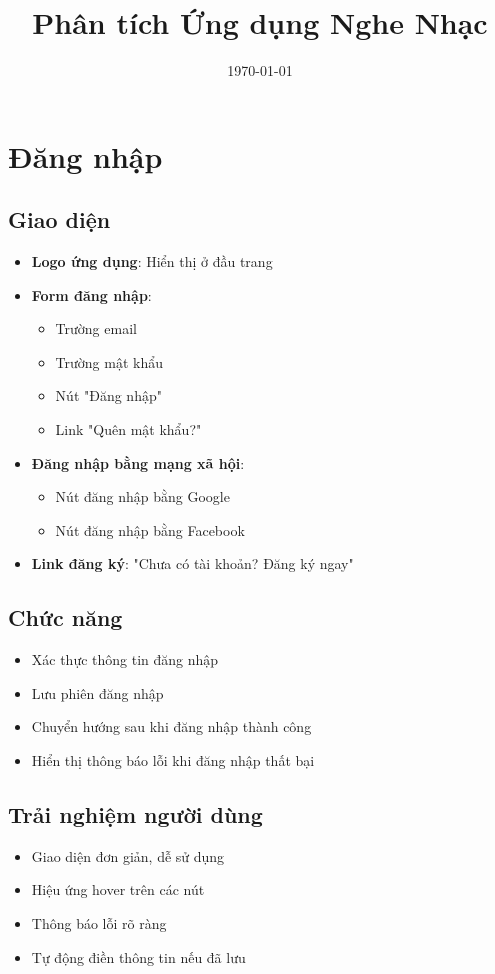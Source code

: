 \documentclass{article}
\title{Phân tích Ứng dụng Nghe Nhạc}
\author{}
\date{\today}
\begin{document}
\maketitle

\tableofcontents

\section{Đăng nhập}
\subsection{Giao diện}
\begin{itemize}
    \item \textbf{Logo ứng dụng}: Hiển thị ở đầu trang
    \item \textbf{Form đăng nhập}:
    \begin{itemize}
        \item Trường email
        \item Trường mật khẩu
        \item Nút "Đăng nhập"
        \item Link "Quên mật khẩu?"
    \end{itemize}
    \item \textbf{Đăng nhập bằng mạng xã hội}:
    \begin{itemize}
        \item Nút đăng nhập bằng Google
        \item Nút đăng nhập bằng Facebook
    \end{itemize}
    \item \textbf{Link đăng ký}: "Chưa có tài khoản? Đăng ký ngay"
\end{itemize}

\subsection{Chức năng}
\begin{itemize}
    \item Xác thực thông tin đăng nhập
    \item Lưu phiên đăng nhập
    \item Chuyển hướng sau khi đăng nhập thành công
    \item Hiển thị thông báo lỗi khi đăng nhập thất bại
\end{itemize}

\subsection{Trải nghiệm người dùng}
\begin{itemize}
    \item Giao diện đơn giản, dễ sử dụng
    \item Hiệu ứng hover trên các nút
    \item Thông báo lỗi rõ ràng
    \item Tự động điền thông tin nếu đã lưu
\end{itemize}
\end{document}
